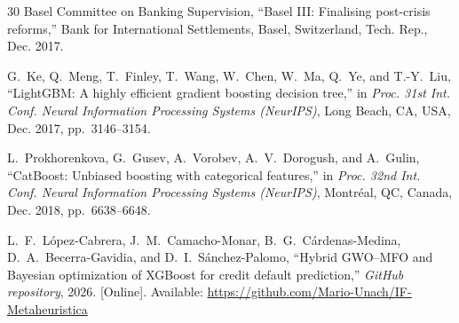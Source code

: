 \documentclass[journal]{IEEEtran}
\begin{document}
\begin{thebibliography}{30}
Basel Committee on Banking Supervision, ``Basel III: Finalising post-crisis reforms,'' Bank for International Settlements, Basel, Switzerland, Tech. Rep., Dec. 2017.

G.~Ke, Q.~Meng, T.~Finley, T.~Wang, W.~Chen, W.~Ma, Q.~Ye, and T.-Y.~Liu, ``LightGBM: A highly efficient gradient boosting decision tree,'' in \emph{Proc. 31st Int. Conf. Neural Information Processing Systems (NeurIPS)}, Long Beach, CA, USA, Dec. 2017, pp.~3146--3154.

L.~Prokhorenkova, G.~Gusev, A.~Vorobev, A.~V.~Dorogush, and A.~Gulin, ``CatBoost: Unbiased boosting with categorical features,'' in \emph{Proc. 32nd Int. Conf. Neural Information Processing Systems (NeurIPS)}, Montréal, QC, Canada, Dec. 2018, pp.~6638--6648.

L.~F.~López-Cabrera, J.~M.~Camacho-Monar, B.~G.~Cárdenas-Medina, D.~A.~Becerra-Gavidia, and D.~I.~Sánchez-Palomo, 
``Hybrid GWO--MFO and Bayesian optimization of XGBoost for credit default prediction,'' 
\emph{GitHub repository}, 2026. [Online]. Available: \url{https://github.com/Mario-Unach/IF-Metaheuristica}

\end{thebibliography}
\end{document}
